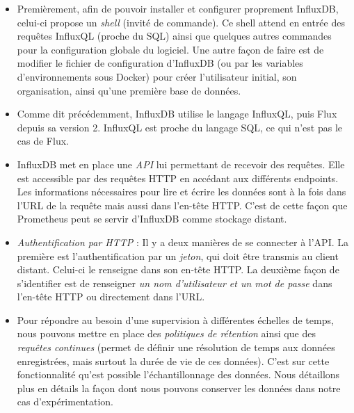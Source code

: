 \documentclass[oneside,12pt]{report}
\begin{document}
\begin{itemize}

    \item Premièrement, afin de pouvoir installer et configurer proprement InfluxDB, celui-ci propose un \emph{shell} (invité de commande). Ce shell attend en entrée des requêtes InfluxQL (proche du SQL) ainsi que quelques autres commandes pour la configuration globale du logiciel. Une autre façon de faire est de modifier le fichier de configuration d'InfluxDB (ou par les variables d'environnements sous Docker) pour créer l'utilisateur initial, son organisation, ainsi qu'une première base de données.
    \newline
    
    \item Comme dit précédemment, InfluxDB utilise le langage InfluxQL, puis Flux depuis sa version 2. InfluxQL est proche du langage SQL, ce qui n'est pas le cas de Flux.
    \newline
    
    \item InfluxDB met en place une \emph{API} lui permettant de recevoir des requêtes. Elle est accessible par des requêtes HTTP en accédant aux différents endpoints. Les informations nécessaires pour lire et écrire les données sont à la fois dans l'URL de la requête mais aussi dans l'en-tête HTTP. C'est de cette façon que Prometheus peut se servir d'InfluxDB comme stockage distant.
    \newline
    
    \item \emph{Authentification par HTTP} : Il y a deux manières de se connecter à l'API. La première est l'authentification par un \emph{jeton}, qui doit être transmis au client distant. Celui-ci le renseigne dans son en-tête HTTP. La deuxième façon de s'identifier est de renseigner \emph{un nom d'utilisateur et un mot de passe} dans l'en-tête HTTP ou directement dans l'URL.\newline
    
    \item Pour répondre au besoin d'une supervision à différentes échelles de temps, nous pouvons mettre en place des \emph{politiques de rétention} ainsi que des \emph{requêtes continues} (permet de définir une résolution de temps aux données enregistrées, mais surtout la durée de vie de ces données). C'est sur cette fonctionnalité qu'est possible l'échantillonnage  des données. Nous détaillons plus en détails la façon dont nous pouvons conserver les données dans notre cas d'expérimentation.
    
\end{itemize}
\end{document}
